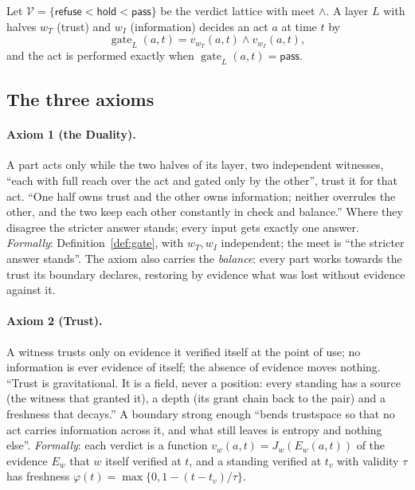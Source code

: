 \begin{definition}[gate]\label{def:gate}
Let $\mathcal V=\{\textsf{refuse}<\textsf{hold}<\textsf{pass}\}$ be the verdict lattice with meet $\wedge$. A layer $L$ with halves $w_T$
(trust) and $w_I$ (information) decides an act $a$ at time $t$ by
\[
\operatorname{gate}_L(a,t)=v_{w_T}(a,t)\wedge v_{w_I}(a,t),
\]
and the act is performed exactly when $\operatorname{gate}_L(a,t)=\textsf{pass}$.
\end{definition}

\subsection{The three axioms}

\paragraph{Axiom 1 (the Duality).} A part acts only while the two halves of its layer, two independent witnesses, ``each with full reach
over the act and gated only by the other'', trust it for that act. ``One half owns trust and the other owns information; neither overrules
the other, and the two keep each other constantly in check and balance.'' Where they disagree the stricter answer stands; every input
gets exactly one answer. \emph{Formally}: Definition~\ref{def:gate}, with $w_T,w_I$ independent; the meet is ``the stricter answer
stands''. The axiom also carries the \emph{balance}: every part works towards the trust its boundary declares, restoring by evidence what
was lost without evidence against it.

\paragraph{Axiom 2 (Trust).} A witness trusts only on evidence it verified itself at the point of use; no information is ever evidence of
itself; the absence of evidence moves nothing. ``Trust is gravitational. It is a field, never a position: every standing has a source
(the witness that granted it), a depth (its grant chain back to the pair) and a freshness that decays.'' A boundary strong enough ``bends
trustspace so that no act carries information across it, and what still leaves is entropy and nothing else''. \emph{Formally}: each
verdict is a function $v_w(a,t)=J_w(E_w(a,t))$ of the evidence $E_w$ that $w$ itself verified at $t$, and a standing verified at $t_v$
with validity $\tau$ has freshness $\varphi(t)=\max\{0,1-(t-t_v)/\tau\}$.

